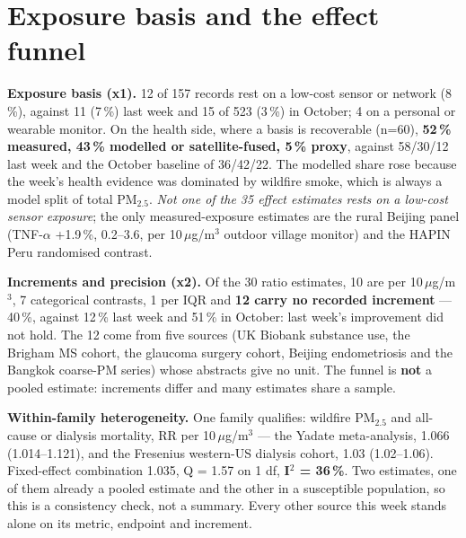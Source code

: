 \documentclass[10pt]{article}
\begin{document}
\vspace{4mm}

\par{}\baselineskip{}\baselineskip
\section*{\sffamily\bfseries\color{Deep}Exposure basis and the effect funnel}
\vspace{-1.5mm}{\color{Teal}\rule{\linewidth}{1.1pt}}\vspace{2.5mm}

\footnotesize
\textbf{Exposure basis (x1).} 12 of 157 records rest on a low-cost sensor or network (8\,\%), against 11 (7\,\%)
last week and 15 of 523 (3\,\%) in October; 4 on a personal or wearable monitor. On the health side, where a basis
is recoverable (n=60), \textbf{52\,\% measured, 43\,\% modelled or satellite-fused, 5\,\% proxy}, against 58/30/12
last week and the October baseline of 36/42/22. The modelled share rose because the week's health evidence was
dominated by wildfire smoke, which is always a model split of total PM$_{2.5}$. \emph{Not one of the 35 effect
estimates rests on a low-cost sensor exposure}; the only measured-exposure estimates are the rural Beijing panel
(TNF-$\alpha$ +1.9\,\%, 0.2--3.6, per 10\,$\mu$g/m$^3$ outdoor village monitor) and the HAPIN Peru randomised
contrast.

\vspace{1.5mm}
\textbf{Increments and precision (x2).} Of the 30 ratio estimates, 10 are per 10\,$\mu$g/m$^3$, 7 categorical
contrasts, 1 per IQR and \textbf{12 carry no recorded increment} --- 40\,\%, against 12\,\% last week and 51\,\% in
October: last week's improvement did not hold. The 12 come from five sources (UK Biobank substance use, the
Brigham MS cohort, the glaucoma surgery cohort, Beijing endometriosis and the Bangkok coarse-PM series) whose
abstracts give no unit. The funnel is \textbf{not} a pooled estimate: increments differ and many estimates share a
sample.

\vspace{1.5mm}
\textbf{Within-family heterogeneity.} One family qualifies: wildfire PM$_{2.5}$ and all-cause or dialysis mortality,
RR per 10\,$\mu$g/m$^3$ --- the Yadate meta-analysis, 1.066 (1.014--1.121), and the Fresenius western-US dialysis
cohort, 1.03 (1.02--1.06). Fixed-effect combination 1.035, Q = 1.57 on 1 df, \textbf{I$^2$ = 36\,\%}. Two
estimates, one of them already a pooled estimate and the other in a susceptible population, so this is a
consistency check, not a summary. Every other source this week stands alone on its metric, endpoint and increment.
\end{document}
